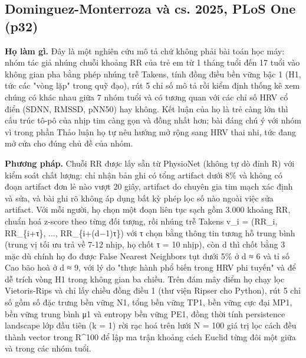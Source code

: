 \documentclass[12pt,a4paper]{article}
\begin{document}
\subsection{Dominguez-Monterroza và cs. 2025, PLoS One \normalfont\small (p32)}
\par\vspace{2pt}
\par\vspace{4pt}
\noindent \textbf{Họ làm gì.} Đây là một nghiên cứu mô tả chứ không phải bài toán học máy: nhóm tác giả nhúng chuỗi khoảng RR của trẻ em từ 1 tháng tuổi đến 17 tuổi vào không gian pha bằng phép nhúng trễ Takens, tính đồng điều bền vững bậc 1 (H1, tức các "vòng lặp" trong quỹ đạo), rút 5 chỉ số mô tả rồi kiểm định thống kê xem chúng có khác nhau giữa 7 nhóm tuổi và có tương quan với các chỉ số HRV cổ điển (SDNN, RMSSD, pNN50) hay không. Kết luận của họ là trẻ càng lớn thì cấu trúc tô-pô của nhịp tim càng gọn và đồng nhất hơn; bài đáng chú ý với nhóm vì trong phần Thảo luận họ tự nêu hướng mở rộng sang HRV thai nhi, tức đang mở cửa cho đúng chủ đề của nhóm.\par\vspace{3pt}
\noindent \textbf{Phương pháp.} Chuỗi RR được lấy sẵn từ PhysioNet (không tự dò đỉnh R) với kiểm soát chất lượng: chỉ nhận bản ghi có tổng artifact dưới 8\% và không có đoạn artifact đơn lẻ nào vượt 20 giây, artifact do chuyên gia tim mạch xác định và sửa, và bài ghi rõ không áp dụng bất kỳ phép lọc số nào ngoài việc sửa artifact. Với mỗi người, họ chọn một đoạn liên tục sạch gồm 3.000 khoảng RR, chuẩn hoá z-score theo từng đối tượng, rồi nhúng trễ Takens v\_i = (RR\_i, RR\_\{i+τ\}, ..., RR\_\{i+(d−1)τ\}) với τ chọn bằng thông tin tương hỗ trung bình (trung vị tối ưu trả về 7-12 nhịp, họ chốt τ = 10 nhịp), còn d thì chốt bằng 3 mặc dù chính họ đo được False Nearest Neighbors tụt dưới 5\% ở d ≈ 6 và tỉ số Cao bão hoà ở d ≈ 9, với lý do "thực hành phổ biến trong HRV phi tuyến" và để dễ trích vòng H1 trong không gian ba chiều. Trên đám mây điểm họ chạy lọc Vietoris-Rips và chỉ lấy chiều đồng điều 1 (thư viện Ripser cho Python), rút 5 chỉ số gồm số đặc trưng bền vững N1, tổng bền vững TP1, bền vững cực đại MP1, bền vững trung bình μ1 và entropy bền vững PE1, đồng thời tính persistence landscape lớp đầu tiên (k = 1) rời rạc hoá trên lưới N = 100 giá trị lọc cách đều thành vector trong R\textasciicircum{}100 để lập ma trận khoảng cách Euclid từng đôi một giữa và trong các nhóm tuổi.\par\vspace{3pt}
\end{document}
